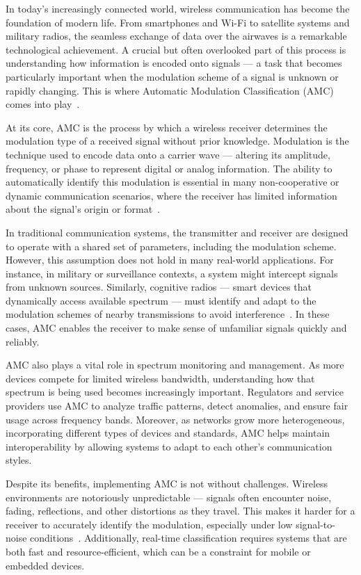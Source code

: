 In today’s increasingly connected world, wireless communication has become the foundation of modern life. From smartphones and Wi-Fi to satellite systems and military radios, the seamless exchange of data over the airwaves is a remarkable technological achievement. A crucial but often overlooked part of this process is understanding how information is encoded onto signals — a task that becomes particularly important when the modulation scheme of a signal is unknown or rapidly changing. This is where Automatic Modulation Classification (AMC) comes into play~\cite{azzouz1996automatic}.

At its core, AMC is the process by which a wireless receiver determines the modulation type of a received signal without prior knowledge. Modulation is the technique used to encode data onto a carrier wave — altering its amplitude, frequency, or phase to represent digital or analog information. The ability to automatically identify this modulation is essential in many non-cooperative or dynamic communication scenarios, where the receiver has limited information about the signal’s origin or format~\cite{swami2000hierarchical}.

In traditional communication systems, the transmitter and receiver are designed to operate with a shared set of parameters, including the modulation scheme. However, this assumption does not hold in many real-world applications. For instance, in military or surveillance contexts, a system might intercept signals from unknown sources. Similarly, cognitive radios — smart devices that dynamically access available spectrum — must identify and adapt to the modulation schemes of nearby transmissions to avoid interference~\cite{yucek2009survey}. In these cases, AMC enables the receiver to make sense of unfamiliar signals quickly and reliably.

AMC also plays a vital role in spectrum monitoring and management. As more devices compete for limited wireless bandwidth, understanding how that spectrum is being used becomes increasingly important. Regulators and service providers use AMC to analyze traffic patterns, detect anomalies, and ensure fair usage across frequency bands. Moreover, as networks grow more heterogeneous, incorporating different types of devices and standards, AMC helps maintain interoperability by allowing systems to adapt to each other's communication styles.

Despite its benefits, implementing AMC is not without challenges. Wireless environments are notoriously unpredictable — signals often encounter noise, fading, reflections, and other distortions as they travel. This makes it harder for a receiver to accurately identify the modulation, especially under low signal-to-noise conditions~\cite{gardner1994cyclostationarity}. Additionally, real-time classification requires systems that are both fast and resource-efficient, which can be a constraint for mobile or embedded devices.

